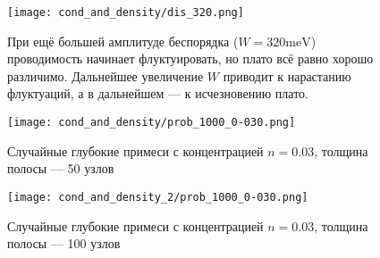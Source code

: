 \begin{figure}[h]
    \centering
    \texttt{[image: cond\_and\_density/dis\_320.png]}
    \caption{При ещё большей амплитуде беспорядка ($W = 320\mathrm{meV}$) проводимость начинает
             флуктуировать, но плато всё равно хорошо различимо. Дальнейшее увеличение $W$ 
             приводит к нарастанию флуктуаций, а в дальнейшем --- к исчезновению плато.}
\end{figure}

\begin{figure}[h]
    \centering
    \texttt{[image: cond\_and\_density/prob\_1000\_0-030.png]}
    \caption{Случайные глубокие примеси с концентрацией $n = 0.03$, 
             толщина полосы --- 50 узлов}
\end{figure}

\begin{figure}[h]
    \centering
    \texttt{[image: cond\_and\_density\_2/prob\_1000\_0-030.png]}
    \caption{Случайные глубокие примеси с концентрацией $n = 0.03$, 
             толщина полосы --- 100 узлов}
\end{figure}
%
\clearpage
